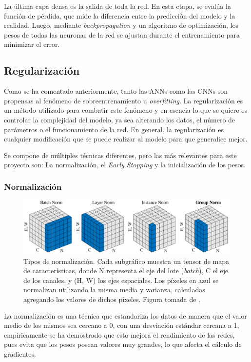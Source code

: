 La última capa densa es la salida de toda la red. En esta etapa, se evalúa la función de pérdida, que mide la diferencia entre la predicción del modelo y la realidad. Luego, mediante \textit{backpropagation} y un algoritmo de optimización, los pesos de todas las neuronas de la red se ajustan durante el entrenamiento para minimizar el error.

\subsection{Regularización}
\label{subsection:regularization}
Como se ha comentado anteriormente, tanto las ANNs como las CNNs son propensas al fenómeno de sobreentrenamiento u \textit{overfitting}. La regularización es un método utilizado para combatir este fenómeno y en esencia lo que se quiere es controlar la complejidad del modelo, ya sea alterando los datos, el número de parámetros o el funcionamiento de la red. En general, la regularización es cualquier modificación que se puede realizar al modelo para que generalice mejor.

Se compone de múltiples técnicas diferentes, pero las más relevantes para este proyecto son: La normalización, el \textit{Early Stopping} y la inicialización de los pesos.

\subsubsection{Normalización}

\begin{figure}[h]
    \centering
    \includegraphics[width=\linewidth]{figures/2_theory/normTypes.pdf}
    \caption[Tipos de normalización]{Tipos de normalización. Cada subgráfico muestra un tensor de mapa de características, donde N representa el eje del lote (\textit{batch}), C el eje de los canales, y (H, W) los ejes espaciales. Los píxeles en azul se normalizan utilizando la misma media y varianza, calculadas agregando los valores de dichos píxeles. Figura tomada de \cite{wu2018group}.}
    \label{fig:normTypes}
\end{figure}

La normalización es una técnica que estandariza los datos de manera que el valor medio de los mismos sea cercano a 0, con una desviación estándar cercana a 1, empíricamente se ha demostrado que esto mejora el rendimiento de las redes, pues evita que los pesos posean valores muy grandes, lo que afecta el cálculo de gradientes. 

